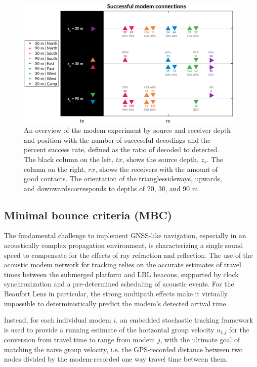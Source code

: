 \begin{figure}[h!]
  \centering
  \includegraphics[width=\textwidth]{figs/modem-chart.pdf}
  \caption{An overview of the modem experiment by source and receiver depth and position with the number of successful decodings and the percent success rate, defined as the ratio of decoded to detected. The black column on the left, $tx$, shows the source depth, $z_s$. The column on the right, $rx$, shows the receivers with the amount of good contacts. The orientation of the triangles\textemdash sideways, upwards, and downwards\textemdash corresponds to depths of 20, 30, and 90 m.}
  \label{fig:overview}
  \end{figure}

\subsection{Minimal bounce criteria (MBC)}

The fundamental challenge to implement GNSS-like navigation, especially in an acoustically complex propagation environment, is characterizing a single sound speed to compensate for the effects of ray refraction and reflection.
The use of the acoustic modem network for tracking relies on the accurate estimates of travel times between the submerged platform and LBL beacons, supported by clock synchronization and a pre-determined scheduling of acoustic events.
 For the Beaufort Lens in particular, the strong multipath effects make it virtually impossible to deterministically predict the modem's detected arrival time.

Instead, for each individual modem $i$, an embedded stochastic tracking framework is used to provide a running estimate of the horizontal group velocity $u_{i,j}$ for the conversion from travel time to range from modem $j$, with the ultimate goal of matching the naive group velocity, i.e. the GPS-recorded distance between two nodes divided by the modem-recorded one way travel time between them. 

